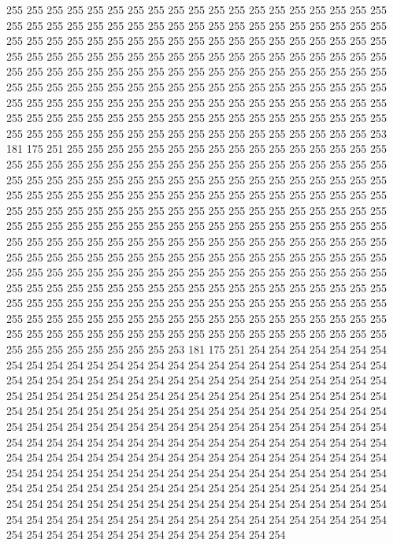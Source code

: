 255 255 255 255 255 255 255 255 255 255 255 255 255 255 255 255 255 255 255 255
255 255 255 255 255 255 255 255 255 255 255 255 255 255 255 255 255 255 255 255
255 255 255 255 255 255 255 255 255 255 255 255 255 255 255 255 255 255 255 255
255 255 255 255 255 255 255 255 255 255 255 255 255 255 255 255 255 255 255 255
255 255 255 255 255 255 255 255 255 255 255 255 255 255 255 255 255 255 255 255
255 255 255 255 255 255 255 255 255 255 255 255 255 255 255 255 255 255 255 255
255 255 255 255 255 255 255 255 255 255 255 255 255 255 255 255 255 255 255 255
255 255 255 255 255 255 255 255 255 255 255 255 255 255 255 255 255 255 255 255
255 255 255 255 255 255 255 255 255 255 253 181 175 251 255 255 255 255 255 255
255 255 255 255 255 255 255 255 255 255 255 255 255 255 255 255 255 255 255 255
255 255 255 255 255 255 255 255 255 255 255 255 255 255 255 255 255 255 255 255
255 255 255 255 255 255 255 255 255 255 255 255 255 255 255 255 255 255 255 255
255 255 255 255 255 255 255 255 255 255 255 255 255 255 255 255 255 255 255 255
255 255 255 255 255 255 255 255 255 255 255 255 255 255 255 255 255 255 255 255
255 255 255 255 255 255 255 255 255 255 255 255 255 255 255 255 255 255 255 255
255 255 255 255 255 255 255 255 255 255 255 255 255 255 255 255 255 255 255 255
255 255 255 255 255 255 255 255 255 255 255 255 255 255 255 255 255 255 255 255
255 255 255 255 255 255 255 255 255 255 255 255 255 255 255 255 255 255 255 255
255 255 255 255 255 255 255 255 255 255 255 255 255 255 255 255 255 255 255 255
255 255 255 255 255 255 255 255 255 255 255 255 255 255 255 255 255 255 255 255
255 255 255 255 255 255 255 255 255 255 255 255 255 255 255 255 255 255 255 255
255 255 255 255 255 255 253 181 175 251 254 254 254 254 254 254 254 254 254 254
254 254 254 254 254 254 254 254 254 254 254 254 254 254 254 254 254 254 254 254
254 254 254 254 254 254 254 254 254 254 254 254 254 254 254 254 254 254 254 254
254 254 254 254 254 254 254 254 254 254 254 254 254 254 254 254 254 254 254 254
254 254 254 254 254 254 254 254 254 254 254 254 254 254 254 254 254 254 254 254
254 254 254 254 254 254 254 254 254 254 254 254 254 254 254 254 254 254 254 254
254 254 254 254 254 254 254 254 254 254 254 254 254 254 254 254 254 254 254 254
254 254 254 254 254 254 254 254 254 254 254 254 254 254 254 254 254 254 254 254
254 254 254 254 254 254 254 254 254 254 254 254 254 254 254 254 254 254 254 254
254 254 254 254 254 254 254 254 254 254 254 254 254 254 254 254 254 254 254 254
254 254 254 254 254 254 254 254 254 254 254 254 254 254 254 254 254 254 254 254
254 254 254 254 254 254 254 254 254 254 254 254 254 254 254 254 254 254 254 254
